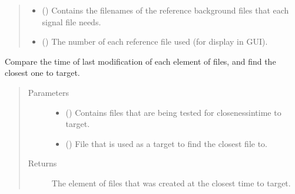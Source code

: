 \documentclass[a4paper,10pt,english]{sphinxmanual}
\begin{document}
\begin{fulllineitems}
\begin{fulllineitems}
\begin{quote}
\begin{description}
\begin{itemize}
\item {} 
\sphinxAtStartPar
{} () \textendash{} Contains the filenames of the reference background files that each signal file needs.

\item {} 
\sphinxAtStartPar
{} () \textendash{} The number of each reference file used (for display in GUI).

\end{itemize}


\end{description}\end{quote}

\end{fulllineitems}


\begin{fulllineitems}
\label{\detokenize{sfgtools:sfgtools.SFGProcessTools.get_closest_file}}
\sphinxAtStartPar
Compare the time of last modification of each element of files, and find the closest one to target.
\begin{quote}\begin{description}
\item[{Parameters}] \leavevmode\begin{itemize}
\item {} 
\sphinxAtStartPar
{} () \textendash{} Contains files that are being tested for closeness\sphinxhyphen{}in\sphinxhyphen{}time to target.

\item {} 
\sphinxAtStartPar
{} () \textendash{} File that is used as a target to find the closest file to.

\end{itemize}

\item[{Returns}] \leavevmode
\sphinxAtStartPar
{} \textendash{} The element of files that was created at the closest time to target.


\end{description}
\end{quote}
\end{fulllineitems}
\end{fulllineitems}
\end{document}
